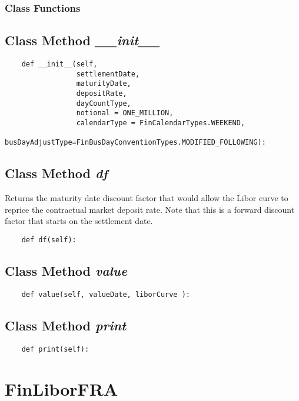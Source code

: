 \documentclass[twoside,11pt]{book}
\begin{document}
\subsubsection{Class Functions}

\subsection{Class Method {\it \_\_init\_\_}}


\begin{lstlisting}
    def __init__(self, 
                 settlementDate, 
                 maturityDate, 
                 depositRate, 
                 dayCountType,
                 notional = ONE_MILLION, 
                 calendarType = FinCalendarTypes.WEEKEND,
                 busDayAdjustType=FinBusDayConventionTypes.MODIFIED_FOLLOWING):
\end{lstlisting}

\subsection{Class Method {\it df}}
Returns the maturity date discount factor that would allow the Libor curve to reprice the contractual market deposit rate. Note that this is a forward discount factor that starts on the settlement date.

\begin{lstlisting}
    def df(self):
\end{lstlisting}

\subsection{Class Method {\it value}}


\begin{lstlisting}
    def value(self, valueDate, liborCurve ):
\end{lstlisting}

\subsection{Class Method {\it print}}


\begin{lstlisting}
    def print(self):
\end{lstlisting}

\newpage
\section{FinLiborFRA}
\end{document}
